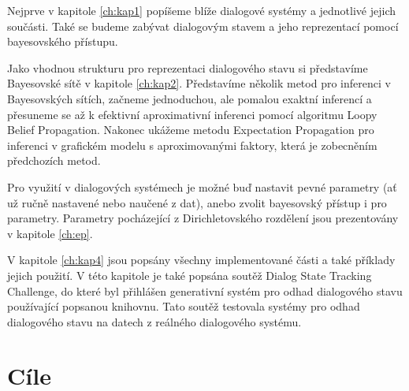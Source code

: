 Nejprve v kapitole \ref{ch:kap1} popíšeme blíže dialogové systémy a jednotlivé jejich součásti.
Také se budeme zabývat dialogovým stavem a jeho reprezentací pomocí bayesovského přístupu.

Jako vhodnou strukturu pro reprezentaci dialogového stavu si představíme Bayesovské sítě v kapitole \ref{ch:kap2}.
Představíme několik metod pro inferenci v Bayesovských sítích, začneme jednoduchou, ale pomalou exaktní inferencí a přesuneme se až k efektivní aproximativní inferenci pomocí algoritmu Loopy Belief Propagation.
Nakonec ukážeme metodu Expectation Propagation pro inferenci v grafickém modelu s aproximovanými faktory, která je zobecněním předchozích metod.

Pro využití v dialogových systémech je možné buď nastavit pevné parametry (ať už ručně nastavené nebo naučené z dat), anebo zvolit bayesovský přístup i pro parametry.
Parametry pocházející z Dirichletovského rozdělení jsou prezentovány v kapitole \ref{ch:ep}.

V kapitole \ref{ch:kap4} jsou popsány všechny implementované části a také příklady jejich použití.
V této kapitole je také popsána soutěž Dialog State Tracking Challenge, do které byl přihlášen generativní systém pro odhad dialogového stavu používající popsanou knihovnu.
Tato soutěž testovala systémy pro odhad dialogového stavu na datech z reálného dialogového systému.

\section*{Cíle}

